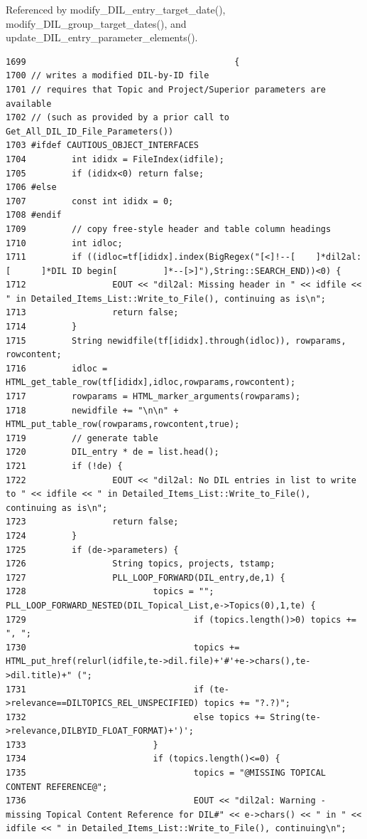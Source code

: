 Referenced by modify\_\-DIL\_\-entry\_\-target\_\-date(), modify\_\-DIL\_\-group\_\-target\_\-dates(), and update\_\-DIL\_\-entry\_\-parameter\_\-elements().



\footnotesize\begin{verbatim}1699                                         {
1700 // writes a modified DIL-by-ID file
1701 // requires that Topic and Project/Superior parameters are available
1702 // (such as provided by a prior call to Get_All_DIL_ID_File_Parameters())
1703 #ifdef CAUTIOUS_OBJECT_INTERFACES
1704         int ididx = FileIndex(idfile);
1705         if (ididx<0) return false;
1706 #else
1707         const int ididx = 0;
1708 #endif
1709         // copy free-style header and table column headings
1710         int idloc;
1711         if ((idloc=tf[ididx].index(BigRegex("[<]!--[    ]*dil2al:[      ]*DIL ID begin[         ]*--[>]"),String::SEARCH_END))<0) {
1712                 EOUT << "dil2al: Missing header in " << idfile << " in Detailed_Items_List::Write_to_File(), continuing as is\n";
1713                 return false;
1714         }
1715         String newidfile(tf[ididx].through(idloc)), rowparams, rowcontent;
1716         idloc = HTML_get_table_row(tf[ididx],idloc,rowparams,rowcontent);
1717         rowparams = HTML_marker_arguments(rowparams);
1718         newidfile += "\n\n" + HTML_put_table_row(rowparams,rowcontent,true);
1719         // generate table
1720         DIL_entry * de = list.head();
1721         if (!de) {
1722                 EOUT << "dil2al: No DIL entries in list to write to " << idfile << " in Detailed_Items_List::Write_to_File(), continuing as is\n";
1723                 return false;
1724         }
1725         if (de->parameters) {
1726                 String topics, projects, tstamp;
1727                 PLL_LOOP_FORWARD(DIL_entry,de,1) {
1728                         topics = ""; PLL_LOOP_FORWARD_NESTED(DIL_Topical_List,e->Topics(0),1,te) {
1729                                 if (topics.length()>0) topics += ", ";
1730                                 topics += HTML_put_href(relurl(idfile,te->dil.file)+'#'+e->chars(),te->dil.title)+" (";
1731                                 if (te->relevance==DILTOPICS_REL_UNSPECIFIED) topics += "?.?)";
1732                                 else topics += String(te->relevance,DILBYID_FLOAT_FORMAT)+')';
1733                         }
1734                         if (topics.length()<=0) {
1735                                 topics = "@MISSING TOPICAL CONTENT REFERENCE@";
1736                                 EOUT << "dil2al: Warning - missing Topical Content Reference for DIL#" << e->chars() << " in " << idfile << " in Detailed_Items_List::Write_to_File(), continuing\n";

\end{verbatim}
